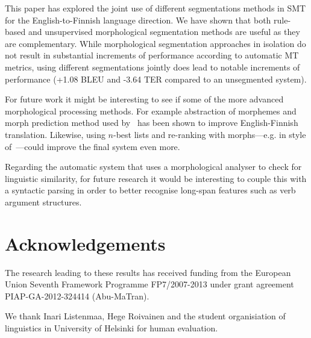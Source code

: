 \documentclass[free]{flammie}
\begin{document}
This paper has explored the joint use of different segmentations methods in SMT for the English-to-Finnish language direction.
We have shown that both rule-based and unsupervised morphological segmentation methods are useful as they are complementary. %
While morphological segmentation approaches in isolation do not result in substantial increments of performance according to automatic MT metrics, using different segmentations jointly does lead to notable increments of performance (+1.08 BLEU and -3.64 TER compared to an unsegmented system).


For future work it might be interesting to see if some of the more advanced morphological processing methods. For example abstraction of morphemes and morph prediction method used by~\cite{clifton2011combining} has been shown to improve English-Finnish translation. Likewise, using $n$-best lists and re-ranking with morphs---e.g. in style of~\cite{dyer2008generalizing,luong2010hybrid}---could improve the final system even more.

Regarding the automatic system that uses a morphological analyser to check for linguistic similarity, for future research it would be interesting to couple this with a syntactic parsing in order to better recognise long-span features such as verb argument structures. 


\section*{Acknowledgements}

The research leading to these results has received
funding from the European Union Seventh Framework
Programme FP7/2007-2013 under grant agreement
PIAP-GA-2012-324414 (Abu-MaTran).

We thank Inari Listenmaa, Hege Roivainen and the student organisiation of linguistics in University of Helsinki for human evaluation.



\end{document}
